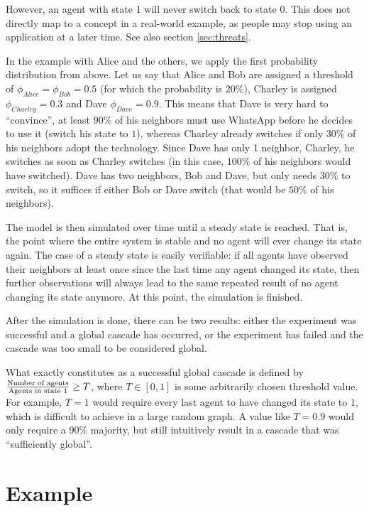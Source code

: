 \documentclass{sig-alternate-05-2015}
\begin{document}
However, an agent with state $1$ will never switch back to state $0$. This does not directly map to a concept in a real-world example, as people may stop using an application at a later time. See also section \ref{sec:threats}.

In the example with Alice and the others, we apply the first probability distribution from above. Let us say that Alice and Bob are assigned a threshold of $\phi_{Alice} = \phi_{Bob} = 0.5$ (for which the probability is $20\%$), Charley is assigned $\phi_{Charley} = 0.3$ and Dave $\phi_{Dave} = 0.9$. This means that Dave is very hard to ``convince'', at least $90\%$ of his neighbors must use WhatsApp before he decides to use it (switch his state to $1$), whereas Charley already switches if only $30\%$ of his neighbors adopt the technology. Since Dave has only 1 neighbor, Charley, he switches as soon as Charley switches (in this case, $100\%$ of his neighbors would have switched). Dave has two neighbors, Bob and Dave, but only needs $30\%$ to switch, so it suffices if either Bob or Dave switch (that would be $50\%$ of his neighbors).

The model is then simulated over time until a steady state is reached. That is, the point where the entire system is stable and no agent will ever change its state again. The case of a steady state is easily verifiable: if all agents have observed their neighbors at least once since the last time any agent changed its state, then further observations will always lead to the same repeated result of no agent changing its state anymore. At this point, the simulation is finished.

After the simulation is done, there can be two results: either the experiment was successful and a global cascade has occurred, or the experiment has failed and the cascade was too small to be considered global.

What exactly constitutes as a successful global cascade is defined by $\frac{\textmd{Number of agents}}{\textmd{Agents in state } 1} \geq T$, where $T \in [0, 1]$ is some arbitrarily chosen threshold value. For example, $T = 1$ would require every last agent to have changed its state to $1$, which is difficult to achieve in a large random graph. A value like $T = 0.9$ would only require a 90\% majority, but still intuitively result in a cascade that was ``sufficiently global''.


\section{Example}\label{sec:example}
\end{document}
